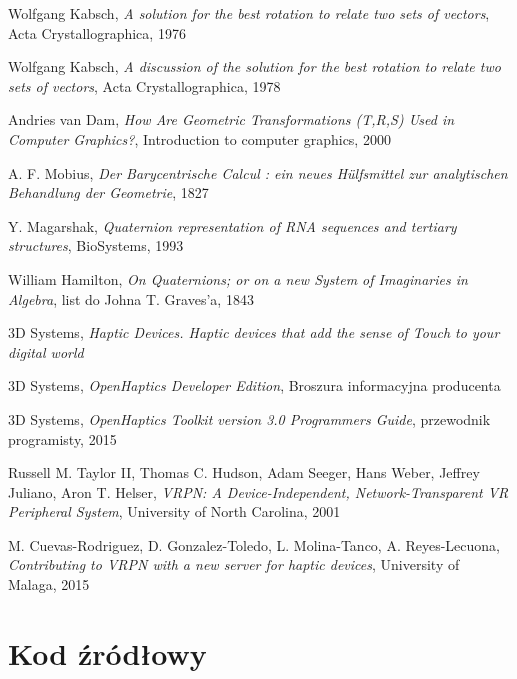 \documentclass[licencjacka]{pracamgr}
\begin{document}
\begin{thebibliography}{99}
 Wolfgang Kabsch, \textit{A solution for the best rotation to relate two sets of vectors}, Acta Crystallographica, 1976

 Wolfgang Kabsch, \textit{A discussion of the solution for the best rotation to relate two sets of vectors}, Acta Crystallographica, 1978

 Andries van Dam, \textit{How Are Geometric
Transformations (T,R,S) Used in Computer Graphics?}, Introduction to computer graphics, 2000

 A. F. Mobius, \textit{Der Barycentrische Calcul : ein neues Hülfsmittel zur analytischen Behandlung der Geometrie}, 1827

 Y. Magarshak, \textit{Quaternion representation of RNA sequences and tertiary structures}, BioSystems, 1993

 William Hamilton, \textit{On Quaternions; or on a new System of Imaginaries in Algebra}, list do Johna T. Graves'a, 1843

 3D Systems, \textit{Haptic Devices. Haptic devices that add the sense of Touch to your digital world}

 3D Systems, \textit{OpenHaptics Developer Edition}, Broszura informacyjna producenta

 3D Systems, \textit{OpenHaptics Toolkit version 3.0 Programmers Guide}, przewodnik programisty, 2015

 Russell M. Taylor II, Thomas C. Hudson, Adam Seeger, Hans Weber, Jeffrey Juliano, Aron T. Helser, \textit{VRPN: A Device-Independent, Network-Transparent VR Peripheral System}, University of North Carolina, 2001

 M. Cuevas-Rodriguez, D. Gonzalez-Toledo, L. Molina-Tanco, A. Reyes-Lecuona, \textit{Contributing to VRPN with a new server for haptic devices}, University of Malaga, 2015

\end{thebibliography}


	\chapter*{Kod źródłowy}
	
\end{document}
